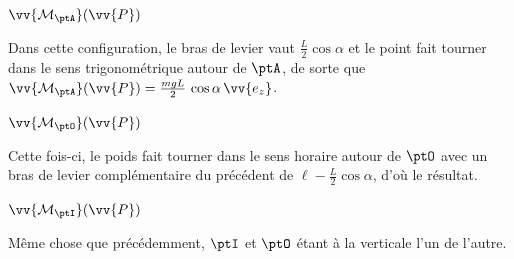 
\begin{enonce}
	$\vv{\mathcal{M}_\ptA}(\vv{P})$
\end{enonce}


\begin{corrige}
	Dans cette configuration, le bras de levier vaut $\frac{L}{2}\cos\alpha$ et le point fait tourner dans le sens trigonométrique autour de $\ptA$, de sorte que $\vv{\mathcal{M}_\ptA}(\vv{P}) = \frac{mgL}{2}\,\cos\alpha\,\vv{e_z}$.
\end{corrige}



\begin{enonce}
	$\vv{\mathcal{M}_\ptO}(\vv{P})$
\end{enonce}


\begin{corrige}
	Cette fois-ci, le poids fait tourner dans le sens horaire autour de $\ptO$ avec un bras de levier complémentaire du précédent de $\ell-\frac{L}{2}\cos\alpha$, d'où le résultat.
\end{corrige}



\begin{enonce}
	$\vv{\mathcal{M}_\ptI}(\vv{P})$
\end{enonce}


\begin{corrige}
	Même chose que précédemment, $\ptI$ et $\ptO$ étant à la verticale l'un de l'autre.
\end{corrige}

\finEntrainement








